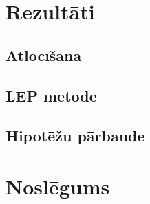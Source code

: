 \documentclass[titlepage, a4paper, LV, SHORT]{mythesis}
\begin{document}
\chapter{Rezultāti}
\label{chap:results}


\section{Atlocīšana}


\clearpage
\section{LEP metode}


\clearpage
\section{Hipotēžu pārbaude}


\chapter{Noslēgums}


\clearpage
\printbibliography[heading=bibintoc]
\end{document}
